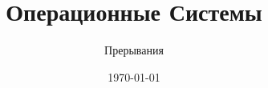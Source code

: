 \documentclass[handout,12pt]{beamer}
\title{Операционные Системы}
\subtitle{Прерывания}
\date{\today}
\begin{document}
  \begin{frame}
    \titlepage
  \end{frame}
  
\end{document}
